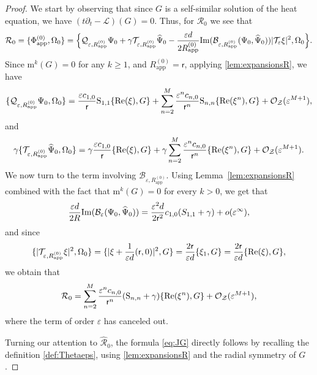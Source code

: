 \documentclass[11pt,reqno,a4paper]{amsart}
\def\eps{\varepsilon}
\def\de{{\partial}}
\def\Re{{\rm Re}}
\def\Im{{\rm Im}}
\newcommand{\cB}{\mathcal{B}}
\newcommand{\cL}{\mathcal{L}}
\newcommand{\cO}{\mathcal{O}}
\newcommand{\cQ}{\mathcal{Q}}
\newcommand{\cR}{\mathcal{R}}
\newcommand{\cT}{\mathcal{T}}
\newcommand{\cZ}{\mathcal{Z}}
\newcommand{\mrm}{\mathrm{m}}
\newcommand{\1}{\mathbbm{1}}
\theoremstyle{definition}
\theoremstyle{definition}
\numberwithin{equation}{section}
\newcommand{\Mapp}[2]{#1^{(#2)}_\mathrm{app}}
\begin{document}
\begin{proof}
    We start by observing that since $G$ is a self-similar solution of the heat equation, we have $(t\de_t-\cL)(G)=0$. Thus, for $\cR_0$ we see that
\begin{align}
 \cR_0=\{\Mapp{\Phi}{0},\Omega_0\}=\Big\{\cQ_{\eps,\Mapp{R}{0}}\Psi_0+\gamma\cT_{\eps,\Mapp{R}{0}}\widehat{\Psi}_0-\frac{\eps d}{2\Mapp{R}{0}}\Im(\cB_{\eps,\Mapp{R}{0}}(\Psi_0,\widehat{\Psi}_0))|\cT_\eps\xi|^2,\Omega_0\Big\}.
\end{align}
Since $\mrm^k(G)=0$ for any $k\geq1$, and $\Mapp{R}{0}=\mathsf{r}$,
applying \cref{lem:expansionsR}, we have
\begin{align}
\{\cQ_{\eps,\Mapp{R}{0}}\Psi_{0},\Omega_0\}=\frac{\eps c_{1,0}}{\mathsf{r}} \mathrm{S}_{1,1}\{\Re(\xi),G\}+\sum_{n=2}^M\frac{\eps^nc_{n,0}}{\mathsf{r}^n}{\rm S}_{n,n}\{\Re(\xi^n),G\}+\cO_{\cZ}(\eps^{M+1}),
\end{align}
and
\begin{align}
\gamma\{\cT_{\eps,\Mapp{R}{0}}\widehat{\Psi}_{0},\Omega_0\}=\gamma\frac{\eps c_{1,0}}{\mathsf{r}}\{\Re(\xi),G\}+\gamma\sum_{n=2}^M\frac{\eps^nc_{n,0}}{\mathsf{r}^n}\{\Re(\xi^n),G\}+\cO_{\cZ}(\eps^{M+1}).
\end{align}
We now turn to the term involving $\cB_{\eps,\Mapp{R}{0}}$. Using Lemma~\ref{lem:expansionsR} combined with the fact that $\mrm^k(G) = 0$ for every $k > 0$, we get that
\begin{equation}
     \frac{\eps d}{2 R} \Im(\cB_\eps(\Psi_0,\widehat{\Psi}_0))
      = \frac{\eps^2 d}{2 \mathsf{r}^2} c_{1,0}(S_{1,1}+\gamma) + o(\eps^\infty),
\end{equation}
and since
\begin{align}
\{|\cT_{\eps,\Mapp{R}{0}}\xi|^2,\Omega_0\}=\{|\xi+\frac{1}{\eps d}(\mathsf{r},0)|^2,G\}=\frac{2\mathsf{r}}{\eps d}\{\xi_1,G\}=\frac{2\mathsf{r}}{\eps d}\{\Re(\xi),G\},
\end{align}
we obtain that
\begin{equation}
    \cR_0=\sum_{n=2}^M\frac{\eps^nc_{n,0}}{\mathsf{r}^n}({\rm S}_{n,n}+\gamma)\{\Re(\xi^n),G\}+\cO_{\cZ}(\eps^{M+1}),
\end{equation}
where the term of order $\eps$  has canceled out.

Turning our attention to $\widehat{\cR}_0$, the formula \cref{eq:JG} directly follows by recalling the definition \cref{def:Thetaeps}, using \cref{lem:expansionsR} and the radial symmetry of $G$.
\end{proof}
\end{document}
